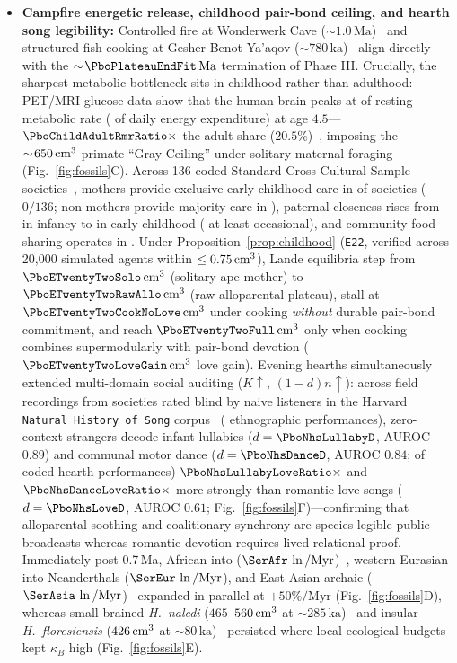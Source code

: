 \begin{itemize}[leftmargin=1.3em,itemsep=1.5pt,topsep=2pt]
\item \textbf{Campfire energetic release, childhood pair-bond ceiling, and hearth song legibility:} Controlled fire at Wonderwerk Cave ($\sim\!1.0\,\mathrm{Ma}$)~\cite{berna2012} and structured fish cooking at Gesher Benot Ya'aqov ($\sim\!780\,\mathrm{ka}$)~\cite{zohar2022,wrangham2009} align directly with the $\sim\!\PboPlateauEndFit\,\mathrm{Ma}$ termination of Phase III. Crucially, the sharpest metabolic bottleneck sits in childhood rather than adulthood: PET/MRI glucose data show that the human brain peaks at \PboChildPeakRmr{} of resting metabolic rate (\PboChildPeakDer{} of daily energy expenditure) at age $4.5$---$\PboChildAdultRmrRatio\times$ the adult share ($20.5\%$)~\cite{kuzawa2014}, imposing the $\sim\!650\,\text{cm}^3$ primate ``Gray Ceiling'' under solitary maternal foraging~\cite{isler2012,hrdy2009} (Fig.~\ref{fig:fossils}C). Across 136 coded Standard Cross-Cultural Sample societies~\cite{kirby2016}, mothers provide exclusive early-childhood care in \PboSccsChildSoloMomPct{} of societies ($0/136$; non-mothers provide majority care in \PboSccsChildAlloMajPct{}), paternal closeness rises from \PboSccsFatherInfPct{} in infancy to \PboSccsFatherChildPct{} in early childhood (\PboSccsFatherOccPct{} at least occasional), and community food sharing operates in \PboSccsFoodSharePct{}. Under Proposition~\ref{prop:childhood} (\texttt{E22}, verified across 20,000 simulated agents within $\le 0.75\,\text{cm}^3$), Lande equilibria step from $\PboETwentyTwoSolo\ccm$ (solitary ape mother) to $\PboETwentyTwoRawAllo\ccm$ (raw alloparental plateau), stall at $\PboETwentyTwoCookNoLove\ccm$ under cooking \emph{without} durable pair-bond commitment, and reach $\PboETwentyTwoFull\ccm$ only when cooking combines supermodularly with pair-bond devotion ($\PboETwentyTwoLoveGain\ccm$ love gain). Evening hearths simultaneously extended multi-domain social auditing ($K\uparrow$, $(1-d)n\uparrow$): across \PboNhsSongsN{} field recordings from \PboNhsSocN{} societies rated blind by \PboNhsRatersN{} naive listeners in the Harvard \texttt{Natural History of Song} corpus~\cite{mehr2019} (\PboNhsEthPerfN{} ethnographic performances), zero-context strangers decode infant lullabies ($d=\PboNhsLullabyD$, AUROC $0.89$) and communal motor dance ($d=\PboNhsDanceD$, AUROC $0.84$; \PboNhsDanceShare{} of coded hearth performances) $\PboNhsLullabyLoveRatio\times$ and $\PboNhsDanceLoveRatio\times$ more strongly than romantic love songs ($d=\PboNhsLoveD$, AUROC $0.61$; Fig.~\ref{fig:fossils}F)---confirming that alloparental soothing and coalitionary synchrony are species-legible public broadcasts whereas romantic devotion requires lived relational proof. Immediately post-0.7\,Ma, African \Homo{} into \Hs{} ($\SerAfr\,\ln/\mathrm{Myr}$)~\cite{hublin2017}, western Eurasian \Homo{} into Neanderthals ($\SerEur\,\ln/\mathrm{Myr}$), and East Asian archaic \Homo{} ($\SerAsia\,\ln/\mathrm{Myr}$)~\cite{ni2021} expanded in parallel at $+50\%/\mathrm{Myr}$ (Fig.~\ref{fig:fossils}D), whereas small-brained \textit{H.~naledi} ($465$--$560\,\text{cm}^3$ at $\sim\!285\,\mathrm{ka}$)~\cite{berger2015} and insular \textit{H.~floresiensis} ($426\,\text{cm}^3$ at $\sim\!80\,\mathrm{ka}$)~\cite{kubo2013} persisted where local ecological budgets kept $\kappa_B$ high (Fig.~\ref{fig:fossils}E).

\end{itemize}
